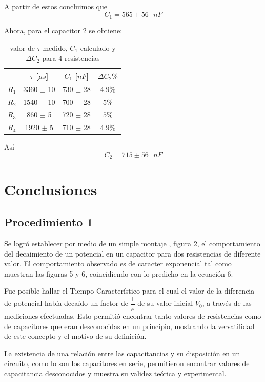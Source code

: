 \documentclass[10pt,letter]{article}
\begin{document}
\begin{multicols}{2}
A partir de estos concluimos que 
$$C_1=565\pm56 \text{ }nF$$

Ahora, para el capacitor 2 se obtiene:
\begin{table}[H]
\centering
\begin{tabular}{|c|c|c|c|}
\hline
 & $\tau$ [$\mu s$] & $C_1$ [$nF$] & $\Delta C_2\%$ \\ \hline
$R_1$ & 3360 $\pm$ 10 & 730 $\pm$ 28 & $4.9\%$ \\ \hline
$R_2$ & 1540 $\pm$ 10 & 700 $\pm$ 28 & $5\%$ \\ \hline
$R_3$ & 860 $\pm$ 5 & 720 $\pm$ 28 & $5\%$ \\ \hline
$R_4$ & 1920 $\pm$ 5 & 710 $\pm$ 28 & $4.9\%$ \\ \hline
\end{tabular}
\caption{valor de $\tau$ medido, $C_1$ calculado y $\Delta C_2$ para 4 resistencias }
\end{table}

Así
$$C_2=715\pm56 \text{ }nF$$

\section{Conclusiones}
\subsection{Procedimiento 1}
Se logró establecer por medio de un simple montaje , figura 2, el comportamiento del decaimiento de un potencial en un capacitor para dos resistencias de diferente valor. El comportamiento observado es de caracter exponencial tal como muestran las figuras 5 y 6, coincidiendo con lo predicho en la ecuación 6.

\vspace{0.2cm}

Fue posible hallar el Tiempo Característico  para el cual el valor de la diferencia de potencial había decaído un factor de $\dfrac{1}{e}$ de su valor inicial $V_0$, a través de las mediciones efectuadas. Esto permitió encontrar tanto valores de resistencias como de capacitores que eran desconocidas en un principio, mostrando la versatilidad de este concepto y el motivo de su definición.

\vspace{0.2cm}
La existencia de una relación entre las capacitancias y su disposición en un circuito, como lo son los capacitores en serie, permitieron encontrar valores de capacitancia desconocidos y muestra su validez teórica y experimental. 

\end{multicols}
\end{document}
